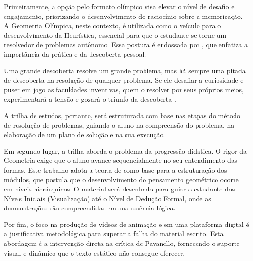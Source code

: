 Primeiramente, a opção pelo formato olímpico visa elevar o nível de desafio e engajamento, priorizando o desenvolvimento do raciocínio sobre a memorização. A Geometria Olímpica, neste contexto, é utilizada como o veículo para o desenvolvimento da Heurística, essencial para que o estudante se torne um resolvedor de problemas autônomo. Essa postura é endossada por , que enfatiza a importância da prática e da descoberta pessoal:

\begin{citacao}
Uma grande descoberta resolve um grande problema, mas há sempre uma pitada de descoberta na resolução de qualquer problema. Se ele desafiar a curiosidade e puser em jogo as faculdades inventivas, quem o resolver por seus próprios meios, experimentará a tensão e gozará o triunfo da descoberta \cite[p.~V]{polya2006arte}.
\end{citacao}

A trilha de estudos, portanto, será estruturada com base nas etapas do método de resolução de problemas, guiando o aluno na compreensão do problema, na elaboração de um plano de solução e na sua execução.

Em segundo lugar, a trilha aborda o problema da progressão didática. O rigor da Geometria exige que o aluno avance sequencialmente no seu entendimento das formas. Este trabalho adota a teoria de  como base para a estruturação dos módulos, que postula que o desenvolvimento do pensamento geométrico ocorre em níveis hierárquicos. O material será desenhado para guiar o estudante dos Níveis Iniciais (Visualização) até o Nível de Dedução Formal, onde as demonstrações são compreendidas em sua essência lógica.

Por fim, o foco na produção de vídeos de animação e em uma plataforma digital é a justificativa metodológica para superar a falha do material escrito. Esta abordagem é a intervenção direta na crítica de Pavanello, fornecendo o suporte visual e dinâmico que o texto estático não consegue oferecer.


